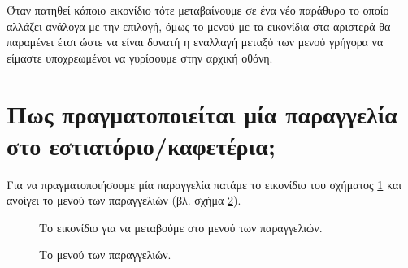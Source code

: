 \documentclass[a4paper,titlepage,twoside,12pt,leqno]{article}
\begin{document}

Όταν πατηθεί κάποιο εικονίδιο τότε μεταβαίνουμε σε ένα νέο παράθυρο το οποίο αλλάζει ανάλογα με την επιλογή, όμως το μενού με τα εικονίδια στα αριστερά θα παραμένει έτσι ώστε να είναι δυνατή η εναλλαγή μεταξύ των μενού γρήγορα να είμαστε υποχρεωμένοι να γυρίσουμε στην αρχική οθόνη.

\newpage
\section{Πως πραγματοποιείται μία παραγγελία στο εστιατόριο/καφετέρια;}

Για να πραγματοποιήσουμε μία παραγγελία πατάμε το εικονίδιο του σχήματος \ref{fig:icon:order} και ανοίγει το μενού των παραγγελιών (βλ. σχήμα \ref{fig:menu:order-food}).

\begin{figure}
\begin{center}
\caption{Το εικονίδιο για να μεταβούμε στο μενού των παραγγελιών.}
\label{fig:icon:order}
\end{center}
\end{figure}

\begin{figure}
\begin{center}
\caption{Το μενού των παραγγελιών.}
\label{fig:menu:order-food}
\end{center}
\end{figure}
\end{document}
